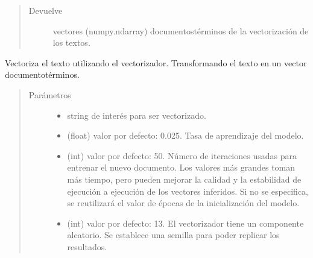 \documentclass[letterpaper,10pt,openany,spanish]{sphinxmanual}
\begin{document}
\begin{fulllineitems}
\begin{fulllineitems}
\begin{quote}
\begin{description}
\begin{itemize}
\end{itemize}

\item[{Devuelve}] \leavevmode
vectores (numpy.ndarray) documentos\sphinxhyphen{}términos de la 
vectorización de los textos.

\end{description}\end{quote}

\end{fulllineitems}


\begin{fulllineitems}
\label{\detokenize{funciones/vectorizacion:vectorizacion.VectorizadorDoc2Vec.vectorizar_texto}}
Vectoriza el texto utilizando el vectorizador. 
Transformando el texto en un vector documento\sphinxhyphen{}términos.
\begin{quote}\begin{description}
\item[{Parámetros}] \leavevmode\begin{itemize}
\item {} 
 \textendash{} string de interés para ser vectorizado.

\item {} 
 \textendash{} (float) valor por defecto: 0.025. 
Tasa de aprendizaje del modelo.

\item {} 
 \textendash{} (int) valor por defecto: 50. Número de iteraciones 
usadas para entrenar el nuevo documento. Los valores más grandes 
toman más tiempo, pero pueden mejorar la calidad y la estabilidad 
de ejecución a ejecución de los vectores inferidos. Si no se 
especifica, se reutilizará el valor de épocas de la 
inicialización del modelo.

\item {} 
 \textendash{} (int) valor por defecto: 13. El vectorizador tiene un 
componente aleatorio. Se establece una semilla para poder 
replicar los resultados.


\end{itemize}
\end{description}
\end{quote}
\end{fulllineitems}
\end{fulllineitems}
\end{document}
